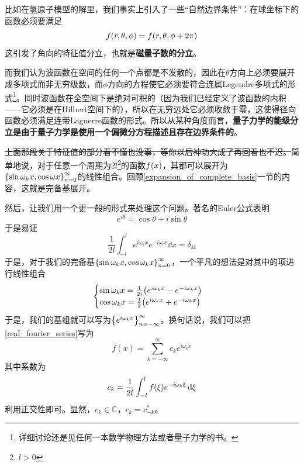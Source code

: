 \documentclass[12pt,a4paper,openany,twoside]{book}
\numberwithin{equation}{section}
\begin{document}
        比如在氢原子模型的解里，我们事实上引入了一些“自然边界条件”：在球坐标下的函数必须要满足
        \begin{equation}
          f\qty(r,\theta, \phi)=f\qty(r,\theta,\phi+2\pi)
        \end{equation}
        这引发了角向的特征值分立，也就是\textbf{磁量子数的分立}。

        而我们认为波函数在空间的任何一个点都是不发散的，因此在$\theta$方向上必须要展开成多项式而非无穷级数，而$\phi$方向的方程使它必须要符合连属Legendre多项式的形式\footnote{详细讨论还是见任何一本数学物理方法或者量子力学的书。}。同时波函数在全空间下是绝对可积的（因为我们已经定义了波函数的内积——它必须是在Hilbert空间下的），所以在无穷远处它必须收敛于零，这使得径向函数必须满足连带Laguerre函数的形式。所以从某种角度而言，\textbf{量子力学的能级分立是由于量子力学是使用一个偏微分方程描述且存在边界条件的}。

        \sout{上面那段关于特征值的部分看不懂也没事，等你以后神功大成了再回看也不迟。}简单地说，对于任意一个周期为$2l$\footnote{$l>0$}的函数$f\qty(x)$，其都可以展开为$\qty{\sin{\omega_k x},\cos{\omega x}}_{n=0}^\infty$的线性组合。回顾\ref{expansion_of_complete_basis}一节的内容，这就是完备基展开。

        然后，让我们用一个更一般的形式来处理这个问题。著名的Euler公式表明
        \begin{equation}
          e^{i\theta}=\cos\theta+i\sin\theta
        \end{equation}
        于是易证
        \begin{equation}
          \frac{1}{2l}\int_{-l}^l{e^{i\omega_k x}e^{-i\omega_l x}\dd{x}}=\delta_{kl}
        \end{equation}
        于是，对于我们的完备基$\qty{\sin{\omega_k x},\cos{\omega_k x}}_{n=0}^\infty$，一个平凡的想法是对其中的项进行线性组合
        \begin{equation}
          \begin{cases}
            \sin{\omega_k x}=\frac{1}{2i}\qty(e^{i\omega_k x}-e^{-i\omega_k x})\\
            \cos{\omega_k x}=\frac{1}{2}\qty(e^{i\omega_k x}+e^{-i\omega_k x})
          \end{cases}
        \end{equation}
        于是，我们的基组就可以写为$\qty{e^{i\omega_k x}}_{n=-\infty}^\infty$。换句话说，我们可以把\ref{real_fourier_series}写为
        \begin{equation}
          f(x) = \sum_{k=-\infty}^{\infty}{c_k e^{i\omega_k x}}
        \end{equation}
        其中系数为
        \begin{equation}
          c_k=\frac{1}{2l}\int_{-l}^l{f\qty(\xi)e^{-i\omega_k\xi}\dd{\xi}}
        \end{equation}
        利用正交性即可。显然，$c_k\in\mathbb{C}$，$c_k=c_{-k}^*$。
\end{document}
